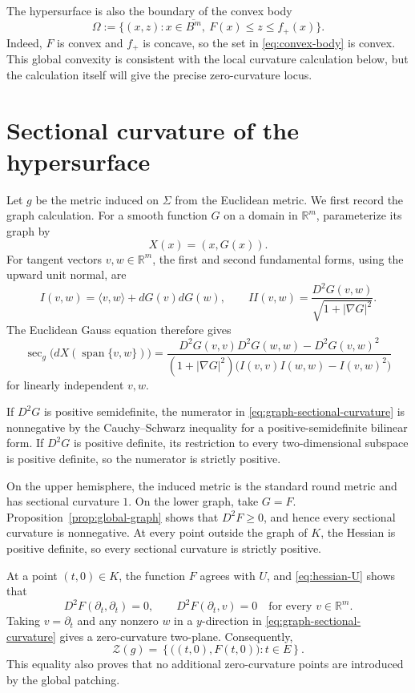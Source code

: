 \documentclass[11pt]{amsart}
\theoremstyle{remark}
\newcommand{\R}{\mathbb R}
\begin{document}
The hypersurface is also the boundary of the convex body
\begin{equation}\label{eq:convex-body}
 \Omega:=\{(x,z):x\in\overline{B^m},\ F(x)\leq z\leq f_+(x)\}.
\end{equation}
Indeed, $F$ is convex and $f_+$ is concave, so the set in \eqref{eq:convex-body} is convex.  This global convexity is consistent with the local curvature calculation below, but the calculation itself will give the precise zero-curvature locus.

\section{Sectional curvature of the hypersurface}

Let $g$ be the metric induced on $\Sigma$ from the Euclidean metric.  We first record the graph calculation.  For a smooth function $G$ on a domain in $\R^m$, parameterize its graph by
\[
 X(x)=(x,G(x)).
\]
For tangent vectors $v,w\in\R^m$, the first and second fundamental forms, using the upward unit normal, are
\begin{equation}\label{eq:fundamental-forms}
 I(v,w)=\langle v,w\rangle+dG(v)dG(w),
 \qquad
 II(v,w)=\frac{D^2G(v,w)}{\sqrt{1+|\nabla G|^2}}.
\end{equation}
The Euclidean Gauss equation therefore gives
\begin{equation}\label{eq:graph-sectional-curvature}
 \sec_g\bigl(dX(\operatorname{span}\{v,w\})\bigr)
 =\frac{
 D^2G(v,v)D^2G(w,w)-D^2G(v,w)^2
 }{
 (1+|\nabla G|^2)
 \bigl(I(v,v)I(w,w)-I(v,w)^2\bigr)
 }
\end{equation}
for linearly independent $v,w$.

If $D^2G$ is positive semidefinite, the numerator in \eqref{eq:graph-sectional-curvature} is nonnegative by the Cauchy--Schwarz inequality for a positive-semidefinite bilinear form.  If $D^2G$ is positive definite, its restriction to every two-dimensional subspace is positive definite, so the numerator is strictly positive.

On the upper hemisphere, the induced metric is the standard round metric and has sectional curvature $1$.  On the lower graph, take $G=F$.  Proposition~\ref{prop:global-graph} shows that $D^2F\geq0$, and hence every sectional curvature is nonnegative.  At every point outside the graph of $K$, the Hessian is positive definite, so every sectional curvature is strictly positive.

At a point $(t,0)\in K$, the function $F$ agrees with $U$, and \eqref{eq:hessian-U} shows that
\[
 D^2F(\partial_t,\partial_t)=0,
 \qquad
 D^2F(\partial_t,v)=0
 \quad\text{for every }v\in\R^m.
\]
Taking $v=\partial_t$ and any nonzero $w$ in a $y$-direction in \eqref{eq:graph-sectional-curvature} gives a zero-curvature two-plane.  Consequently,
\begin{equation}\label{eq:zero-locus-exact}
 \mathcal Z(g)
 =\left\{\bigl((t,0),F(t,0)\bigr):t\in E\right\}.
\end{equation}
This equality also proves that no additional zero-curvature points are introduced by the global patching.
\end{document}
